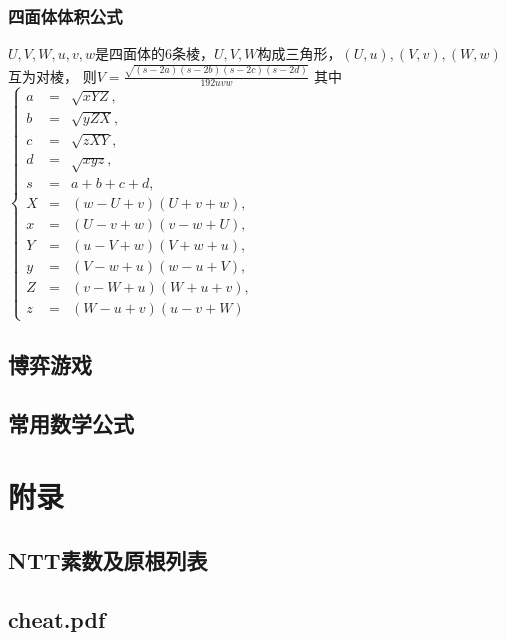 \documentclass[landscape,twocolumn,a4paper]{article}
\begin{document}
\subsubsection{四面体体积公式}

$U, V, W, u, v, w$是四面体的$6$条棱，$U, V, W$构成三角形，$(U, u), (V, v), (W, w)$互为对棱，
则$V = \frac{\sqrt{(s - 2a)(s - 2b)(s - 2c)(s - 2d)}}{192 uvw}$
其中$\left\{\begin{array}{lll}
a & = & \sqrt{xYZ}, \\
b & = & \sqrt{yZX}, \\
c & = & \sqrt{zXY}, \\
d & = & \sqrt{xyz}, \\
s & = & a + b + c + d, \\ 
X & = & (w - U + v)(U + v + w), \\
x & = & (U - v + w)(v - w + U), \\
Y & = & (u - V + w)(V + w + u), \\
y & = & (V - w + u)(w - u + V), \\
Z & = & (v - W + u)(W + u + v), \\
z & = & (W - u + v)(u - v + W)
\end{array}\right.$



\subsection{博弈游戏}

\subsection{常用数学公式}


\section{附录}
\subsection{NTT素数及原根列表}

\subsection{cheat.pdf}

\fi
\end{document}
